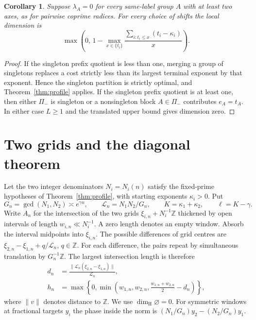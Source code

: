 \documentclass[11pt,reqno,a4paper]{amsart}
\newtheorem{corollary}[theorem]{Corollary}
\theoremstyle{remark}
\numberwithin{equation}{section}
\begin{document}
\begin{corollary}\label{cor:coprime-dimension}
Suppose $\lambda_A=0$ for every same-label group $A$ with
at least two axes, as for pairwise coprime radices. For every
choice of shifts the local dimension is
\[
 \max\left(0,\,
   1-\max_{x\in\{t_i\}}\frac{\sum_{i:t_i\le x}(t_i-\kappa_i)}{x}
 \right).
\]
\end{corollary}

\begin{proof}
If the singleton prefix quotient is less than one, merging a
group of singletons replaces a cost strictly less than its
largest terminal exponent by that exponent. Hence the singleton
partition is strictly optimal, and Theorem~\ref{thm:profile}
applies. If the singleton prefix quotient is at least one,
then either $\Pi_-$ is singleton or a nonsingleton block
$A\in\Pi_-$ contributes $e_A=t_A$. In either case $L\ge1$ and
the translated upper bound gives dimension zero.
\end{proof}

\section{Two grids and the diagonal theorem}\label{sec:two-grids}

Let the two integer denominators \(N_i=N_i(n)\) satisfy the fixed-prime
hypotheses of Theorem~\ref{thm:profile}, with starting exponents
\(\kappa_i>0\). Put
\[
  G_n=\gcd(N_1,N_2)\asymp e^{\gamma n},\qquad
  \mathcal L_n=N_1N_2/G_n,\qquad
  K=\kappa_1+\kappa_2,\qquad \ell=K-\gamma .
\]
Write \(A_n\) for the intersection of the two grids
\(\xi_{i,n}+N_i^{-1}\mathbb Z\) thickened by open intervals of length
\(w_{i,n}\ll N_i^{-1}\). A zero length denotes an empty window.
Absorb the interval midpoints into \(\xi_{i,n}\).
The possible differences of grid centres are
\(\xi_{2,n}-\xi_{1,n}+q/\mathcal L_n\), \(q\in\mathbb Z\).
For each difference, the pairs repeat by simultaneous translation by
\(G_n^{-1}\mathbb Z\). The largest intersection length is therefore
\begin{equation}\label{eq:two-grid-overlap}
  \begin{split}
    d_n&=\frac{\|\mathcal L_n(\xi_{2,n}-\xi_{1,n})\|}{\mathcal L_n},\\
    h_n&=\max\!\left\{0,\min\!\left(w_{1,n},w_{2,n},
                      \frac{w_{1,n}+w_{2,n}}2-d_n\right)\right\},
  \end{split}
\end{equation}
where \(\|v\|\) denotes distance to \(\mathbb Z\). We use
\(\dim_{\mathrm H}\varnothing=0\).
For symmetric windows at fractional targets \(y_i\) the phase inside the norm is
\((N_1/G_n)y_2-(N_2/G_n)y_1\).
\end{document}
